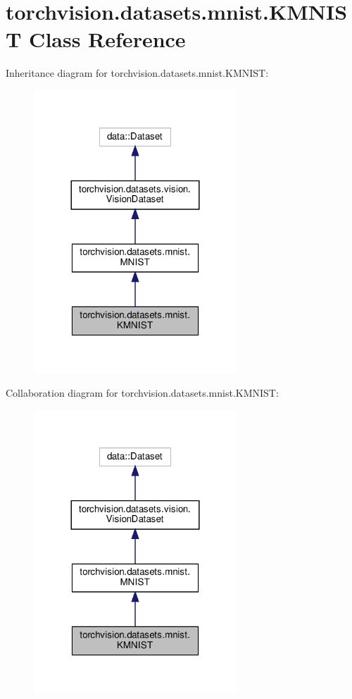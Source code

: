 \hypertarget{classtorchvision_1_1datasets_1_1mnist_1_1KMNIST}{}\section{torchvision.\+datasets.\+mnist.\+K\+M\+N\+I\+ST Class Reference}
\label{classtorchvision_1_1datasets_1_1mnist_1_1KMNIST}


Inheritance diagram for torchvision.\+datasets.\+mnist.\+K\+M\+N\+I\+ST\+:
\nopagebreak
\begin{figure}[H]
\begin{center}
\leavevmode
\includegraphics[width=216pt]{classtorchvision_1_1datasets_1_1mnist_1_1KMNIST__inherit__graph}
\end{center}
\end{figure}


Collaboration diagram for torchvision.\+datasets.\+mnist.\+K\+M\+N\+I\+ST\+:
\nopagebreak
\begin{figure}[H]
\begin{center}
\leavevmode
\includegraphics[width=216pt]{classtorchvision_1_1datasets_1_1mnist_1_1KMNIST__coll__graph}
\end{center}
\end{figure}
